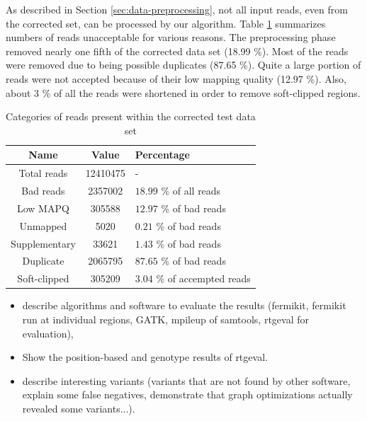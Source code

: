 As described in Section \ref{sec:data-preprocessing}, not all input reads, even from the corrected set, can be processed by our algorithm. Table \ref{tab:corrected-set-categories} summarizes numbers of reads unacceptable for various reasons. The preprocessing phase removed nearly one fifth of the corrected data set (18.99 \%). Most of the reads were removed due to being possible duplicates (87.65 \%). Quite a large portion of  reads were not accepted because of their low mapping quality (12.97 \%). Also, about 3 \% of all the reads were shortened in order to remove soft-clipped regions.

\begin{table}[h]
\begin{center}
\caption{Categories of reads present within the corrected test data set}
\label{tab:corrected-set-categories}
\begin{tabular}{| c | c | p{5cm} |}
\hline
Name & Value & Percentage \\
\hline
Total reads & 12410475 & - \\
\hline
Bad reads & 2357002  & $18.99$ \% of all reads \\
\hline
Low MAPQ & 305588 & $12.97$ \% of bad reads \\
\hline
Unmapped & 5020 & $0.21$ \% of bad reads \\
\hline
Supplementary & 33621 & $1.43$ \% of bad reads \\
\hline
Duplicate & 2065795 & $87.65$ \% of bad reads \\
\hline
Soft-clipped & 305209 & $3.04$ \% of accempted reads \\
\hline
\end{tabular}
\end{center}
\end{table}


\begin{itemize}
\item describe algorithms and software to evaluate the results (fermikit, fermikit run at individual regions, GATK, mpileup of samtools, rtgeval for evaluation),
\item Show the position-based and genotype results of rtgeval.
\item describe interesting variants (variants that are not found by other software, explain some false negatives, demonstrate that graph optimizations actually revealed some variants...).
\end{itemize}
